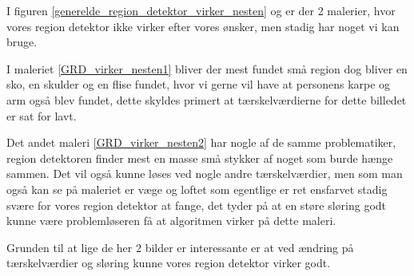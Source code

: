 I figuren \ref{generelde_region_detektor_virker_nesten} og er der 2
malerier, hvor vores region detektor ikke virker efter vores ønsker, men
stadig har noget vi kan bruge. 

I maleriet \ref{GRD_virker_nesten1}
bliver der mest fundet små region dog bliver en sko, en skulder og en
flise fundet, hvor vi gerne vil have at personens karpe og arm også blev
fundet, dette skyldes primert at tærskelværdierne for dette billedet er
sat for lavt. 

Det andet maleri \ref{GRD_virker_nesten2} har nogle af de
samme problematiker, region detektoren finder mest en masse små stykker
af noget som burde hænge sammen. Det vil også kunne løses ved nogle
andre tærskelværdier, men som man også kan se på maleriet er væge og
loftet som egentlige er ret ensfarvet stadig svære for vores region
detektor at fange, det tyder på at en støre sløring godt kunne være
problemløseren få at algoritmen virker på dette maleri. 

Grunden til at lige de her 2 bilder er interessante er at ved ændring på
tærskelværdier og sløring kunne vores region detektor virker godt.

